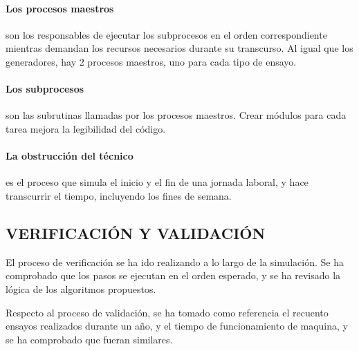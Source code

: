 \paragraph{Los procesos maestros}
son los responsables de ejecutar los subprocesos en el orden correspondiente mientras demandan los recursos necesarios durante su transcurso. Al igual que los generadores, hay 2 procesos maestros, uno para cada tipo de ensayo.

\paragraph{Los subprocesos}
son las subrutinas llamadas por los procesos maestros. Crear módulos para cada tarea mejora la legibilidad del código.
\paragraph{La obstrucción del técnico}
es el proceso que simula el inicio y el fin de una jornada laboral, y hace transcurrir el tiempo, incluyendo los fines de semana.

\subsection{VERIFICACIÓN Y VALIDACIÓN}

El proceso de verificación se ha ido realizando a lo largo de la simulación.
Se ha comprobado que los pasos se ejecutan en el orden esperado,
y se ha revisado la lógica de los algoritmos propuestos.

Respecto al proceso de validación,
se ha tomado como referencia el recuento ensayos realizados durante un año,
y el tiempo de funcionamiento de maquina, y se ha comprobado que fueran similares. 
